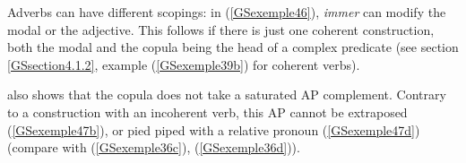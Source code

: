 \documentclass[output=paper]{langsci/langscibook}
\begin{document}
{\begin{exe}
	\ex \label{GSexemple45} 
	\begin{xlist}
        \label{GSexemple45a}

		\label{GSexemple45b}
		\end{xlist}
\end{exe}

Adverbs can have different scopings: in (\ref{GSexemple46}), \textit{immer} can modify the modal or the adjective. This follows if there is just one coherent construction, both the modal and the copula being the head of a complex predicate (see section \ref{GSsection4.1.2}, example (\ref{GSexemple39b}) for coherent verbs).

\begin{exe}
	\label{GSexemple46}

\end{exe}

\cite{Mueller2002b} also shows that the copula does not take a saturated AP complement. Contrary to a construction with an incoherent verb, this AP cannot be extraposed (\ref{GSexemple47b}), or pied piped with a relative pronoun (\ref{GSexemple47d}) (compare with (\ref{GSexemple36c}), (\ref{GSexemple36d})).   

\begin{exe}
	\ex \label{GSexemple47} 
	\begin{xlist}
        \label{GSexemple47a}


\end{xlist}
\end{exe}}
\end{document}
